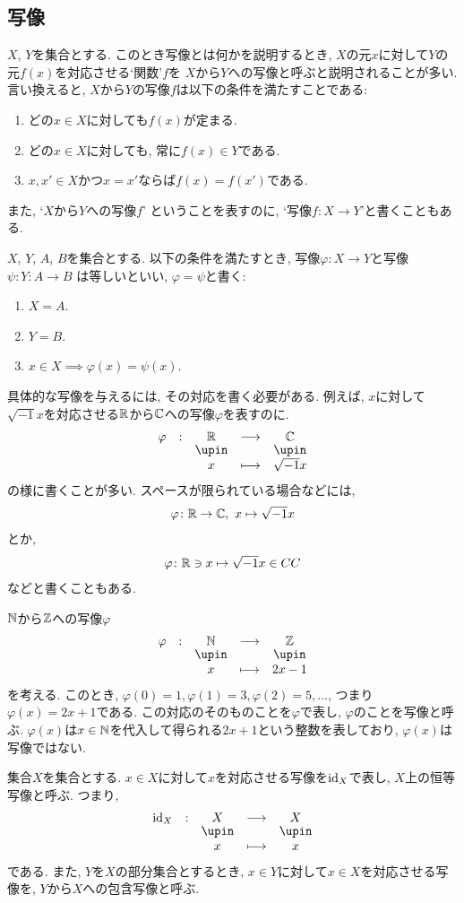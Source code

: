 \subsection{写像}
$X$, $Y$を集合とする.
このとき写像とは何かを説明するとき,
$X$の元$x$に対して$Y$の元$f(x)$を対応させる`関数'$f$を
$X$から$Y$への写像と呼ぶと説明されることが多い.
言い換えると, $X$から$Y$の写像$f$は以下の条件を満たすことである:
\begin{enumerate}
\item どの$x\in X$に対しても$f(x)$が定まる.
\item どの$x\in X$に対しても, 常に$f(x)\in Y$である.
\item $x, x'\in X$かつ$x=x'$ならば$f(x)=f(x')$である.
\end{enumerate}
また, `$X$から$Y$への写像$f$' ということを表すのに,
`写像$f\colon X\to Y$'と書くこともある.
\begin{definition}
$X$, $Y$, $A$, $B$を集合とする.
以下の条件を満たすとき,
写像$\varphi\colon X\to Y$と写像$\psi\colon Y\colon A\to  B$
は等しいといい, $\varphi=\psi$と書く:
\begin{enumerate}
\item $X=A$.
\item $Y=B$.
\item $x\in X\implies \varphi(x)=\psi(x)$.
\end{enumerate}
\end{definition}

具体的な写像を与えるには,
その対応を書く必要がある.
例えば, $x$に対して$\sqrt{-1}x$を対応させる$\mathbb{R}$から$\mathbb{C}$への写像$\varphi$を表すのに.
\begin{align*}
\shazo{\varphi}{\RR}{\CC}
{x}{\sqrt{-1}x}
\end{align*}
の様に書くことが多い.
スペースが限られている場合などには,
\begin{align*}
\varphi\colon \mathbb{R} \to \mathbb{C},\ x\mapsto \sqrt{-1}x
\end{align*}
とか,
\begin{align*}
\varphi\colon \mathbb{R}\ni x\mapsto \sqrt{-1}x \in CC
\end{align*}
などと書くこともある.

\begin{remark}
$\mathbb{N}$から$\mathbb{Z}$への写像$\varphi$
\begin{align*}
\shazo{\varphi}{\NN}{\ZZ}
{x}{2x-1}
\end{align*}
を考える.
このとき,
$\varphi(0)=1,\varphi(1)=3,\varphi(2)=5,\ldots$, 
つまり$\varphi(x)=2x+1$である.
この対応のそのものことを$\varphi$で表し, $\varphi$のことを写像と呼ぶ.
$\varphi(x)$は$x\in\mathbb{N}$を代入して得られる$2x+1$という整数を表しており,
$\varphi(x)$は写像ではない.
\end{remark}
\begin{definition}
集合$X$を集合とする.
$x\in X$に対して$x$を対応させる写像を$\operatorname{id}_X$で表し,
$X$上の恒等写像と呼ぶ. つまり,
\begin{align*}
\shazo{\id_X}{X}{X}
{x}{x}
\end{align*}
である.
また, $Y$を$X$の部分集合とするとき,
$x\in Y$に対して$x\in X$を対応させる写像を,
$Y$から$X$への包含写像と呼ぶ.
\end{definition}

